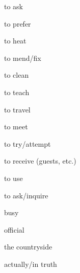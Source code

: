 \begin{flashcard}{\LARGE to ask}
\LARGE {}
\end{flashcard}
\begin{flashcard}{\LARGE to prefer}
\LARGE {}
\end{flashcard}
\begin{flashcard}{\LARGE to heat}
\LARGE {}
\end{flashcard}
\begin{flashcard}{\LARGE to mend/fix}
\LARGE {}
\end{flashcard}
\begin{flashcard}{\LARGE to clean}
\LARGE {}
\end{flashcard}
\begin{flashcard}{\LARGE to teach}
\LARGE {}
\end{flashcard}
\begin{flashcard}{\LARGE to travel}
\LARGE {}
\end{flashcard}
\begin{flashcard}{\LARGE to meet}
\LARGE {}
\end{flashcard}
\begin{flashcard}{\LARGE to try/attempt}
\LARGE {}
\end{flashcard}
\begin{flashcard}{\LARGE to receive (guests, etc.)}
\LARGE {}
\end{flashcard}
\begin{flashcard}{\LARGE to use}
\LARGE {}
\end{flashcard}
\begin{flashcard}{\LARGE to ask/inquire}
\LARGE {}
\end{flashcard}
\begin{flashcard}{\LARGE busy}
\LARGE {}
\end{flashcard}
\begin{flashcard}{\LARGE official}
\LARGE {}
\end{flashcard}
\begin{flashcard}{\LARGE the countryside}
\LARGE {}
\end{flashcard}
\begin{flashcard}{\LARGE actually/in truth}
\LARGE {}
\end{flashcard}

